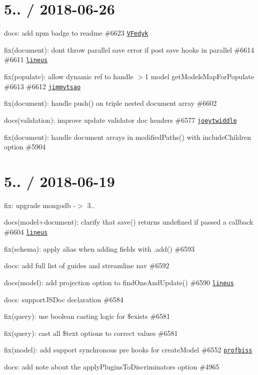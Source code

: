 \section*{5.. / 2018-\/06-\/26 }


\begin{DoxyItemize}
\item docs\+: add npm badge to readme \#6623 \href{https://github.com/VFedyk}{\tt V\+Fedyk}
\item fix(document)\+: don\textquotesingle{}t throw parallel save error if post save hooks in parallel \#6614 \#6611 \href{https://github.com/lineus}{\tt lineus}
\item fix(populate)\+: allow dynamic ref to handle $>$1 model get\+Models\+Map\+For\+Populate \#6613 \#6612 \href{https://github.com/jimmytsao}{\tt jimmytsao}
\item fix(document)\+: handle {\ttfamily push()} on triple nested document array \#6602
\item docs(validation)\+: improve update validator doc headers \#6577 \href{https://github.com/joeytwiddle}{\tt joeytwiddle}
\item fix(document)\+: handle document arrays in {\ttfamily modified\+Paths()} with include\+Children option \#5904
\end{DoxyItemize}

\section*{5.. / 2018-\/06-\/19 }


\begin{DoxyItemize}
\item fix\+: upgrade mongodb -\/$>$ 3..
\item docs(model+document)\+: clarify that {\ttfamily save()} returns {\ttfamily undefined} if passed a callback \#6604 \href{https://github.com/lineus}{\tt lineus}
\item fix(schema)\+: apply alias when adding fields with .add() \#6593
\item docs\+: add full list of guides and streamline nav \#6592
\item docs(model)\+: add {\ttfamily projection} option to {\ttfamily find\+One\+And\+Update()} \#6590 \href{https://github.com/lineus}{\tt lineus}
\item docs\+: support\+J\+S\+Doc declaration \#6584
\item fix(query)\+: use boolean casting logic for \$exists \#6581
\item fix(query)\+: cast all \$text options to correct values \#6581
\item fix(model)\+: add support synchronous pre hooks for {\ttfamily create\+Model} \#6552 \href{https://github.com/profbiss}{\tt profbiss}
\item docs\+: add note about the {\ttfamily apply\+Plugins\+To\+Discriminators} option \#4965
\end{DoxyItemize}

